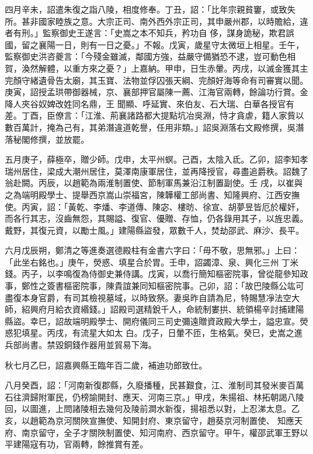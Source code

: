 \begin{pinyinscope}
 四月辛未，詔遣朱復之詣八陵，相度修奉。丁丑，詔：「比年宗親貧窶，或致失所。甚非國家睦族之意。大宗正司、南外西外宗正司，其申嚴州郡，以時贍給，違者有刑。」監察御史王遂言：「史嵩之本不知兵，矜功自
 侈，謀身詭秘，欺君誤國，留之襄陽一日，則有一日之憂。」不報。戊寅，歲星守太微垣上相星。壬午，監察御史洪咨夔言：「今殘金雖滅，鄰國方強，益嚴守備猶恐不逮，豈可動色相賀，渙然解體，以重方來之憂？」上嘉納。甲申，日生赤暈。丙戌，以滅金獲其主完顏守緒遺骨告太廟，其玉寶、法物並俘囚張天綱、完顏好海等命有司審實以聞。庚寅，詔授孟珙帶御器械，京、襄部押官屬陳一薦、江海官兩轉，餘論功行賞。金降人夾谷奴婢改姓同名鼎，王
 聞顯、呼延實、來伯友、石大瑞、白華各授官有差。丁酉，臣僚言：「江淮、荊襄諸路都大提點坑冶吳淵，恃才貪虐，籍人家貲以數百萬計，掩為己有，其弟潛違道乾譽，任用非類。」詔吳淵落右文殿修撰，吳潛落秘閣修撰，並放罷。



 五月庚子，薛極卒，贈少師。戊申，太平州螟。己酉，太陰入氐。乙卯，詔李知孝瑞州居住，梁成大潮州居住，莫澤南康軍居住，並再降授官，尋盡追爵秩。詔魏了翁赴闕。丙辰，以趙範為兩淮制置使、節制軍馬兼沿江制置副使。壬
 戌，以崔與之為端明殿學士、提舉西京嵩山崇福宮，陳韡權工部尚書、知隆興府、江西安撫使。丙寅，詔：「黃乾、李燔、李道傳、陳宓、樓昉、徐宣、胡夢昱皆厄於權奸，而各行其志，沒齒無怨，其賜謚、復官、優贈、存恤，仍各錄用其子，以旌忠義。戴野，其復元資，以勵士風。」建陽縣盜發，眾數千人，焚劫邵武、麻沙、長平。



 六月戊辰朔，鄭清之等進奏選德殿柱有金書六字曰：「毋不敬，思無邪。」上曰：「此坐右銘也。」庚午，熒惑、填星合於胃。壬申，詔蠲漳、泉、興化三州
 丁米錢。丙子，以李鳴復為侍御史兼侍講。戊寅，以喬行簡知樞密院事，曾從龍參知政事，鄭性之簽書樞密院事，陳貴誼兼同知樞密院事。己卯，詔：「故巴陵縣公竑可盡復本身官爵，有司其檢視墓域，以時致祭。妻吳昨自請為尼，特賜慧凈法空大師，紹興府月給衣資緡錢。」詔殿司選精銳千人，命統制婁拱、統領楊辛討捕建陽縣盜。幸巳，詔故端明殿學士、開府儀同三司史彌遠贈資政殿大學士，謚忠宣。熒惑犯填星。丙戌，有流星大如太
 白。戊子，日暈不匝，生格氣。癸巳，史嵩之進兵部尚書。禁毀銅錢作器用並貿易下海。



 秋七月乙巳，詔嘉興縣王臨年百二歲，補迪功郎致仕。



 八月癸酉，詔：「河南新復郡縣，久廢播種，民甚艱食，江、淮制司其發米麥百萬石往濟歸附軍民，仍榜諭開封、應天、河南三京。」甲戌，朱揚祖、林拓朝謁八陵回，以圖進，上問諸陵相去幾何及陵前澗水新復，揚祖悉以對，上忍涕太息。乙亥，以趙範為京河關陜宣撫使、知開封府、東京留守，趙葵京河制置使、
 知應天府、南京留守，全子才關陜制置使、知河南府、西京留守。甲午，權邵武軍王野以平建陽寇有功，官兩轉，餘推賞有差。




\end{pinyinscope}

